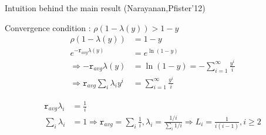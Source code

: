 \begin{frame}{Intuition behind the main result (Narayanan,Pfister'12)}
\begin{block}{Convergence condition : $\rho(1-\lambda(y)) > 1-y$}
\begin{align*}
\rho(1-\lambda(y)) &= 1-y \\
e^{-\texttt{r}_{avg} \lambda(y)} &= e^{\ln(1-y)}\\
\Rightarrow -\texttt{r}_{avg} \lambda(y)&= \ln(1-y) = -\sum_{i=1}^{\infty} \frac{y^i}{i}\\
\Rightarrow \texttt{r}_{avg} \sum_i \lambda_i y^i & = \sum_{i=1}^{\infty} \frac{y^i}{i}
\end{align*}
\end{block}
\pause
\begin{block}{}
\begin{align*}
\texttt{r}_{avg} \lambda_i &= \frac{1}{i}\\
\sum_i \lambda_i & = 1 \Rightarrow \boxed{\texttt{r}_{avg} = \sum_i \frac{1}{i}, \lambda_i = \frac{1/i}{\sum_i 1/i}} \Rightarrow \boxed{L_i = \frac{1}{i(i-1)}, i\geq2}
\end{align*}
\end{block}
\end{frame}
